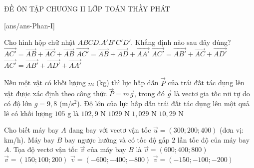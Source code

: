 \begin{name}
	{\tenchude}
	{ĐỀ ÔN TẬP CHƯƠNG II}
	{LỚP TOÁN THẦY PHÁT}
	{\thoigian}
\end{name}

\TN
{}[ans/ans\currfilebase-Phan-I]
\begin{ex}%
 Cho hình hộp chữ nhật $ABCD.A'B'C'D'$. Khẳng định nào sau đây đúng?
 \choice
 {$\overrightarrow{AC'}=\overrightarrow{AB}+\overrightarrow{AC}+\overrightarrow{AB}$}
 {\True $\overrightarrow{AC'}=\overrightarrow{AB}+\overrightarrow{AD}+\overrightarrow{AA'}$}
 {$\overrightarrow{AC'}=\overrightarrow{AB'}+\overrightarrow{AC}+\overrightarrow{AD'}$}
 {$\overrightarrow{AC'}=\overrightarrow{AB'}+\overrightarrow{AD'}+\overrightarrow{AA'}$}
\end{ex}

\begin{ex}%
 Nếu một vật có khối lượng $m$ (kg) thì lực hấp dẫn $\overrightarrow{P}$ của trái đất tác dụng lên vật được xác định theo công thức $\overrightarrow P=m\overrightarrow g$, trong đó $\overrightarrow g$ là vectơ gia tốc rơi tự do có độ lớn $g=9{,}8$ (m/s$^2$). Độ lớn của lực hấp dẫn trái đất tác dụng lên một quả lê có khối lượng $105$ g là
 \choice
 {$102{,}9$ N}
 {$1029$ N}
 {\True $1{,}029$ N}
 {$10{,}29$ N}
\end{ex}

\begin{ex}%
 Cho biết máy bay $A$ đang bay với vectơ vận tốc $\overrightarrow u=( 300;200;400)$ (đơn vị: km/h). Máy bay $B$ bay ngược hướng và có tốc độ gấp $2$ lần tốc độ của máy bay $A$. Tọa độ vectơ vận tốc $\overrightarrow v$ của máy bay $B$ là
 \choice
 {$\overrightarrow v=(600;400;800)$}
 {$\overrightarrow v=(150;100;200)$}
 {\True $\overrightarrow v=(-600;-400;-800)$}
 {$\overrightarrow v=(-150;-100;-200)$}
 \end{ex}

